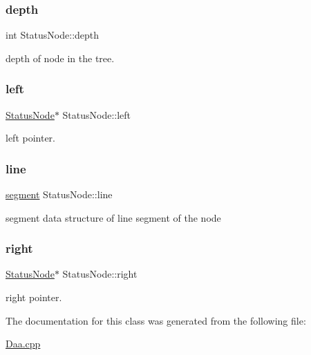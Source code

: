 \subsubsection{\texorpdfstring{depth}{depth}}
{\footnotesize\ttfamily int Status\+Node\+::depth}



depth of node in the tree. 

\mbox{\label{class_status_node_a4d0bbda2f104426a1ec804beb5a1504e}} 
\subsubsection{\texorpdfstring{left}{left}}
{\footnotesize\ttfamily \hyperlink{class_status_node}{Status\+Node}$\ast$ Status\+Node\+::left}



left pointer. 

\mbox{\label{class_status_node_a94811b906bb52ab079fd6d85f4f04a00}} 
\subsubsection{\texorpdfstring{line}{line}}
{\footnotesize\ttfamily \hyperlink{structsegment}{segment} Status\+Node\+::line}



segment data structure of line segment of the node 

\mbox{\label{class_status_node_a32820acf8d0d267b06024e0b5bec52b8}} 
\subsubsection{\texorpdfstring{right}{right}}
{\footnotesize\ttfamily \hyperlink{class_status_node}{Status\+Node}$\ast$ Status\+Node\+::right}



right pointer. 



The documentation for this class was generated from the following file\+:\begin{DoxyCompactItemize}
\item 
\hyperlink{_daa_8cpp}{Daa.\+cpp}\end{DoxyCompactItemize}
